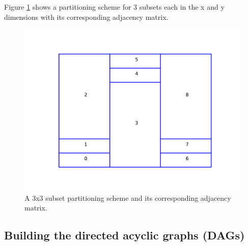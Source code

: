 Figure \ref{25basematrix} shows a partitioning scheme for 3 subsets each in the x and y dimensions with its corresponding adjacency matrix.

\begin{figure}[H]
\begin{minipage}[c]{0.5\textwidth}
\centering
\includegraphics[scale=0.7]{../../figures/boundaries_worst.pdf}
\end{minipage}
\begin{minipage}[c]{0.6\textwidth}
\centering
{}
\end{minipage}
\caption{A 3x3 subset partitioning scheme and its corresponding adjacency matrix.}
\label{25basematrix}
\end{figure}

\subsection{Building the directed acyclic graphs (DAGs)}

